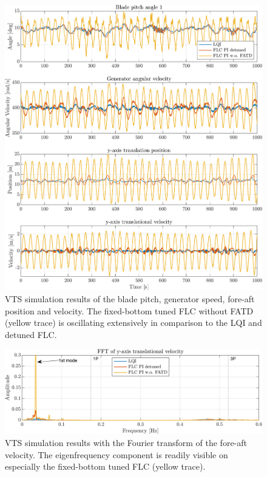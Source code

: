 \begin{figure}[h]
	\centering
	\includegraphics[width=0.7\linewidth]{Graphics/TestResults/VTSplotting/3_th_w_py_vy.png}
	\caption{VTS simulation results of the blade pitch, generator speed, fore-aft position and velocity. The fixed-bottom tuned FLC without FATD (yellow trace) is oscillating extensively in comparison to the LQI and detuned FLC.}
	\label{fig:vts_3_th_w_py_vy}
\end{figure}
\begin{figure}[h]
	\centering
	\includegraphics[width=0.7\linewidth]{Graphics/TestResults/VTSplotting/4_fft_py.png}
	\caption{VTS simulation results with the Fourier transform of the fore-aft velocity. The eigenfrequency component is readily visible on especially the fixed-bottom tuned FLC (yellow trace).}
	\label{fig:vts_4_fft_py}
\end{figure}

